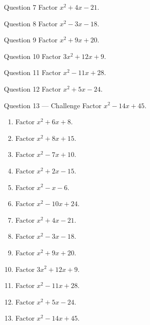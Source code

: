 \documentclass[11pt]{article}
\begin{document}
\begin{qbox}{Question 7}
Factor $x^2+4x-21$.\workspace{1.8cm}
\end{qbox}

\begin{qbox}{Question 8}
Factor $x^2-3x-18$.\workspace{1.8cm}
\end{qbox}

\begin{qbox}{Question 9}
Factor $x^2+9x+20$.\workspace{1.8cm}
\end{qbox}

\begin{qbox}{Question 10}
Factor $3x^2+12x+9$.\workspace{2.0cm}
\end{qbox}

\begin{qbox}{Question 11}
Factor $x^2-11x+28$.\workspace{1.8cm}
\end{qbox}

\begin{qbox}{Question 12}
Factor $x^2+5x-24$.\workspace{1.8cm}
\end{qbox}

\begin{qbox}{Question 13 --- Challenge}
Factor $x^2-14x+45$.\workspace{2.0cm}
\end{qbox}

\clearpage
{}

\begin{recapbox}
\begin{multicols}{2}
\small
\begin{enumerate}[leftmargin=*,itemsep=3pt]
  \item Factor $x^2+6x+8$.
  \item Factor $x^2+8x+15$.
  \item Factor $x^2-7x+10$.
  \item Factor $x^2+2x-15$.
  \item Factor $x^2-x-6$.
  \item Factor $x^2-10x+24$.
  \item Factor $x^2+4x-21$.
  \item Factor $x^2-3x-18$.
  \item Factor $x^2+9x+20$.
  \item Factor $3x^2+12x+9$.
  \item Factor $x^2-11x+28$.
  \item Factor $x^2+5x-24$.
  \item Factor $x^2-14x+45$.
\end{enumerate}
\end{multicols}
\end{recapbox}
\end{document}
